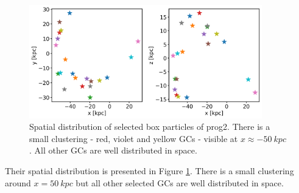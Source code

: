 \begin{figure}[htbp]
\captionsetup{format=plain}
    \centering
    \includegraphics[width=0.9\textwidth]{plots/Dynamics/prog2/gowidsk_progenitor2_box_distribution.png}
    \caption{Spatial distribution of selected box particles of prog2. There is a small clustering - red, violet and yellow \acp{GC} - visible at $x\approx -\SI{50}{kpc}$. All other \acp{GC} are well distributed in space.}
    \label{fig:box_GCs_distr}
\end{figure}

Their spatial distribution is presented in Figure \ref{fig:box_GCs_distr}. There is a small clustering around $x = \SI{50}{kpc}$ but all other selected GCs are well distributed in space. 

